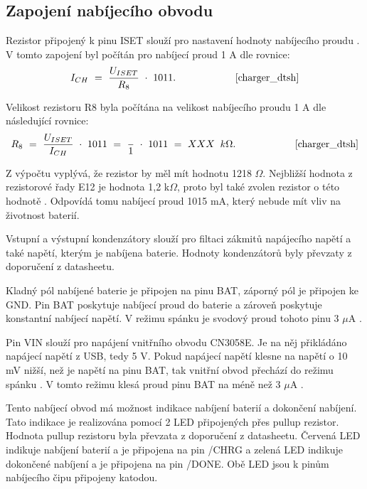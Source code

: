 \subsection{Zapojení nabíjecího obvodu}
Rezistor připojený k pinu ISET slouží pro nastavení hodnoty nabíjecího proudu \cite{charger_dtsh}. V tomto zapojení byl počítán pro nabíjecí proud 1 A dle rovnice: 
\begin{equation} 
  I_{CH}~=~\frac{U_{ISET}}{R_{8}}~\cdot~1011. 
  \quad \quad \quad \quad \quad \quad \cite{charger_dtsh}
\label{eq:I_CH}
\end{equation}



Velikost rezistoru R8 byla počítána na velikost nabíjecího proudu 1 A dle následující rovnice:
\begin{equation} 
  R_{8}~=~\frac{U_{ISET}}{I_{CH}}~\cdot~1011~=~\frac{}{1}~\cdot~1011~=~XXX~\:k\Omega. 
  \quad \quad \quad \quad \quad \quad \cite{charger_dtsh}
\label{eq:I_CH}
\end{equation}


Z výpočtu vyplývá, že rezistor by měl mít hodnotu 1218 $\Omega$. Nejbližší hodnota z rezistorové řady E12 je hodnota 1,2 k$\Omega$, proto byl také zvolen rezistor 
o této hodnotě \cite{rezistorova_rada}. Odpovídá tomu nabíjecí proud 1015 mA, který nebude mít vliv na životnost baterií. 


Vstupní a výstupní kondenzátory slouží pro filtaci zákmitů napájecího napětí a také napětí, kterým je nabíjena baterie. Hodnoty kondenzátorů byly převzaty
z doporučení z datasheetu.

Kladný pól nabíjené baterie je připojen na pinu BAT, záporný pól je připojen ke GND. Pin BAT poskytuje nabíjecí proud do baterie a zároveň poskytuje konstantní 
nabíjecí napětí. V režimu spánku je svodový proud tohoto pinu 3 $\mu$A \cite{charger_dtsh}. 

Pin VIN slouží pro napájení vnitřního obvodu CN3058E. Je na něj přikládáno napájecí napětí z USB, tedy 5 V. Pokud napájecí napětí klesne na napětí o 10 mV nižší, 
než je napětí na pinu BAT, tak vnitřní obvod přechází do režimu spánku \cite{charger_dtsh}. V tomto režimu klesá proud pinu BAT na méně než 3 $\mu$A \cite{charger_dtsh}.

Tento nabíjecí obvod má možnost indikace nabíjení baterií a dokončení nabíjení. Tato indikace je realizována pomocí 2 LED připojených přes pullup rezistor. Hodnota
pullup rezistoru byla převzata z doporučení z datasheetu. Červená LED indikuje nabíjení baterií a je připojena na pin /CHRG a zelená LED indikuje dokončené nabíjení 
a je připojena na pin /DONE. Obě LED jsou k pinům nabíjecího čipu připojeny katodou. 

